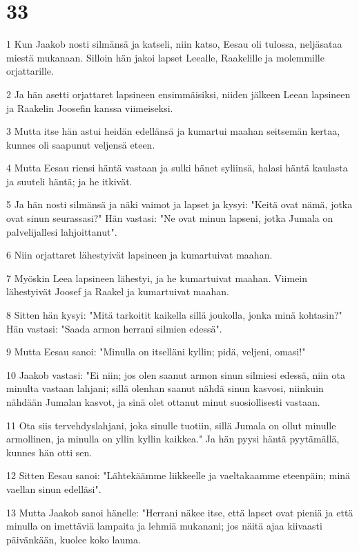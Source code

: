 \chapter{33}

\par 1 Kun Jaakob nosti silmänsä ja katseli, niin katso, Eesau oli tulossa, neljäsataa miestä mukanaan. Silloin hän jakoi lapset Leealle, Raakelille ja molemmille orjattarille.
\par 2 Ja hän asetti orjattaret lapsineen ensimmäisiksi, niiden jälkeen Leean lapsineen ja Raakelin Joosefin kanssa viimeiseksi.
\par 3 Mutta itse hän astui heidän edellänsä ja kumartui maahan seitsemän kertaa, kunnes oli saapunut veljensä eteen.
\par 4 Mutta Eesau riensi häntä vastaan ja sulki hänet syliinsä, halasi häntä kaulasta ja suuteli häntä; ja he itkivät.
\par 5 Ja hän nosti silmänsä ja näki vaimot ja lapset ja kysyi: "Keitä ovat nämä, jotka ovat sinun seurassasi?" Hän vastasi: "Ne ovat minun lapseni, jotka Jumala on palvelijallesi lahjoittanut".
\par 6 Niin orjattaret lähestyivät lapsineen ja kumartuivat maahan.
\par 7 Myöskin Leea lapsineen lähestyi, ja he kumartuivat maahan. Viimein lähestyivät Joosef ja Raakel ja kumartuivat maahan.
\par 8 Sitten hän kysyi: "Mitä tarkoitit kaikella sillä joukolla, jonka minä kohtasin?" Hän vastasi: "Saada armon herrani silmien edessä".
\par 9 Mutta Eesau sanoi: "Minulla on itselläni kyllin; pidä, veljeni, omasi!"
\par 10 Jaakob vastasi: "Ei niin; jos olen saanut armon sinun silmiesi edessä, niin ota minulta vastaan lahjani; sillä olenhan saanut nähdä sinun kasvosi, niinkuin nähdään Jumalan kasvot, ja sinä olet ottanut minut suosiollisesti vastaan.
\par 11 Ota siis tervehdyslahjani, joka sinulle tuotiin, sillä Jumala on ollut minulle armollinen, ja minulla on yllin kyllin kaikkea." Ja hän pyysi häntä pyytämällä, kunnes hän otti sen.
\par 12 Sitten Eesau sanoi: "Lähtekäämme liikkeelle ja vaeltakaamme eteenpäin; minä vaellan sinun edelläsi".
\par 13 Mutta Jaakob sanoi hänelle: "Herrani näkee itse, että lapset ovat pieniä ja että minulla on imettäviä lampaita ja lehmiä mukanani; jos näitä ajaa kiivaasti päivänkään, kuolee koko lauma.
